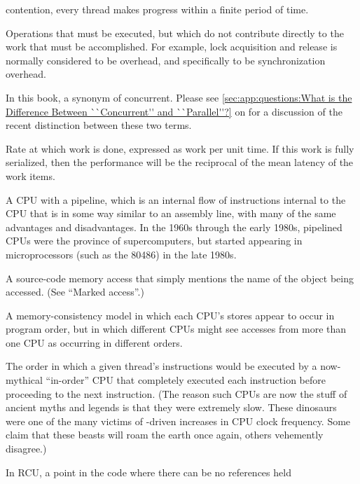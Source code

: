 \begin{description}
	contention, every thread makes progress within a finite
	period of time.
\item[\IX{Overhead}:]
	Operations that must be executed, but which do not contribute
	directly to the work that must be accomplished.
	For example, lock acquisition and release is normally considered
	to be overhead, and specifically to be synchronization overhead.
\item[\IX{Parallel}:]
	In this book, a synonym of concurrent.
	Please see \cref{sec:app:questions:What is the Difference Between ``Concurrent'' and ``Parallel''?}
	on 
	for a discussion of the recent distinction between these two
	terms.
\item[\IX{Performance}:]
	Rate at which work is done, expressed as work per unit time.
	If this work is fully serialized, then the performance will
	be the reciprocal of the mean latency of the work items.
\item[\IXr{Pipelined CPU}:]
	A CPU with a pipeline, which is
	an internal flow of instructions internal to the CPU that
	is in some way similar to an assembly line, with many of
	the same advantages and disadvantages.
	In the 1960s through the early 1980s, pipelined CPUs were the
	province of supercomputers, but started appearing in microprocessors
	(such as the 80486) in the late 1980s.
\item[\IX{Plain Access}:]
	A source-code memory access that simply mentions the name of
	the object being accessed.
	(See ``Marked access''.)
\item[\IXalth{Process Consistency}{process}{memory consistency}:]
	A memory-consistency model in which each CPU's stores appear to
	occur in program order, but in which different CPUs might see
	accesses from more than one CPU as occurring in different orders.
\item[\IX{Program Order}:]
	The order in which a given thread's instructions
	would be executed by a now-mythical ``in-order'' CPU that
	completely executed each instruction before proceeding to
	the next instruction.
	(The reason such CPUs are now the stuff of ancient myths
	and legends is that they were extremely slow.
	These dinosaurs were one of the many victims of
	-driven increases in CPU clock frequency.
	Some claim that these beasts will roam the earth once again,
	others vehemently disagree.)
\item[\IX{Quiescent State}:]
	In RCU, a point in the code where there can be no references held

\end{description}
